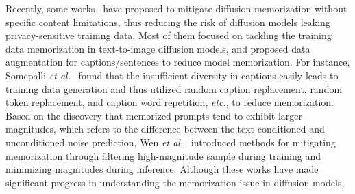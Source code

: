 Recently, some works~\cite{somepalli2023diffusion,daras2024ambient,somepalli2024understanding,wen2023detecting} have proposed to mitigate diffusion memorization without specific content limitations, thus reducing the risk of diffusion models leaking privacy-sensitive training data. Most of them focused on tackling the training data memorization in text-to-image diffusion models, and proposed data augmentation for captions/sentences to reduce model memorization.  For instance, Somepalli \MakeLowercase{\textit{et al.}}~\cite{somepalli2024understanding} found that the insufficient diversity in captions easily leads to training data generation and thus utilized random caption replacement, random token replacement, and caption word repetition, \MakeLowercase{\textit{etc.}}, to reduce memorization. 
Based on the discovery that memorized prompts tend to exhibit larger magnitudes, which refers to the difference between the text-conditioned and unconditioned noise prediction, Wen \MakeLowercase{\textit{et al.}}~\cite{wen2023detecting} introduced methods for mitigating memorization through filtering high-magnitude sample during training and minimizing magnitudes during inference. Although these works have made significant progress in understanding the memorization issue in diffusion models, 



